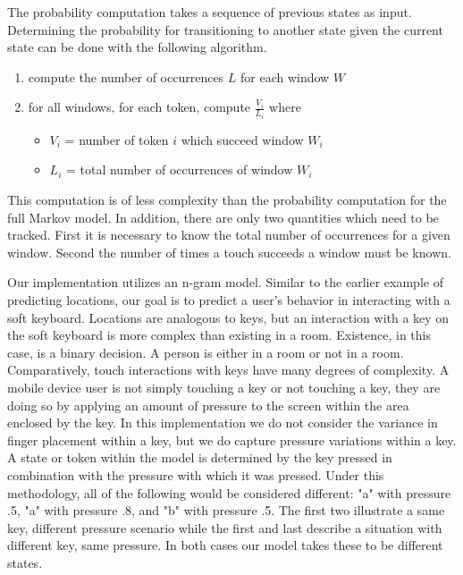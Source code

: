 The probability computation takes a sequence of 
previous states as input.
Determining the probability for transitioning to
another state given the current state can be done
with the following algorithm.
\begin{enumerate}
\item compute the number of occurrences $L$ for each window $W$
\item for all windows, for each token, compute $\frac{V_i}{L_i}$ where
  \begin{itemize} 
  \item $V_i$ = number of token $i$ which succeed window $W_i$
  \item $L_i$ = total number of occurrences of window $W_i$
  \end{itemize}
\end{enumerate}
This computation is of less complexity than 
the probability computation for the full Markov model.
In addition,
there are only two quantities which need to be tracked.
First it is necessary to know the total number of occurrences
for a given window.
Second the number of times a touch succeeds a window must be known. 

Our implementation utilizes an n-gram model.
Similar to the earlier example of predicting locations,
our goal is to predict a user's behavior in
interacting with a soft keyboard.
Locations are analogous to keys, but
an interaction with a key on the soft keyboard is 
more complex than 
existing in a room.
%
Existence, in this case, is a binary decision.
A person is either in a room or not in a room.
Comparatively, touch interactions with keys have
many degrees of complexity.
A mobile device user is not simply
touching a key or not touching a key,
they are doing so by applying an amount of pressure to the screen
within the area enclosed by the key.
%
In this implementation we do not consider the variance 
in finger placement within a key,
but we do capture pressure variations within a key. 
%
A state or token within the model is
determined by the key pressed in combination with
the pressure with which it was pressed.
Under this methodology,
all of the following would be considered different:
"a" with pressure .5,
"a" with pressure .8, and
"b" with pressure .5.
The first two illustrate a same key, different pressure scenario
while the first and last describe
a situation with different key, same pressure.
In both cases our model takes these to be 
different states.


